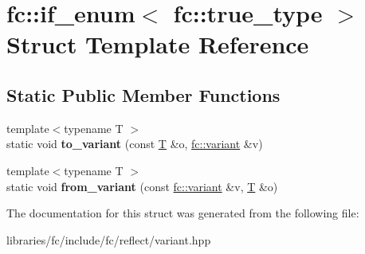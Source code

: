 \hypertarget{structfc_1_1if__enum_3_01fc_1_1true__type_01_4}{}\section{fc\+:\+:if\+\_\+enum$<$ fc\+:\+:true\+\_\+type $>$ Struct Template Reference}
\label{structfc_1_1if__enum_3_01fc_1_1true__type_01_4}
\subsection*{Static Public Member Functions}
\begin{DoxyCompactItemize}
\item 
\mbox{\label{structfc_1_1if__enum_3_01fc_1_1true__type_01_4_a11eac43004dde4068db8314f3dc2650d}} 
{\footnotesize template$<$typename T $>$ }\\static void {\bfseries to\+\_\+variant} (const \mbox{\hyperlink{struct_t}{T}} \&o, \mbox{\hyperlink{classfc_1_1variant}{fc\+::variant}} \&v)
\item 
\mbox{\label{structfc_1_1if__enum_3_01fc_1_1true__type_01_4_a4d28193c3ee53bef7021897448489ba2}} 
{\footnotesize template$<$typename T $>$ }\\static void {\bfseries from\+\_\+variant} (const \mbox{\hyperlink{classfc_1_1variant}{fc\+::variant}} \&v, \mbox{\hyperlink{struct_t}{T}} \&o)
\end{DoxyCompactItemize}


The documentation for this struct was generated from the following file\+:\begin{DoxyCompactItemize}
\item 
libraries/fc/include/fc/reflect/variant.\+hpp\end{DoxyCompactItemize}
